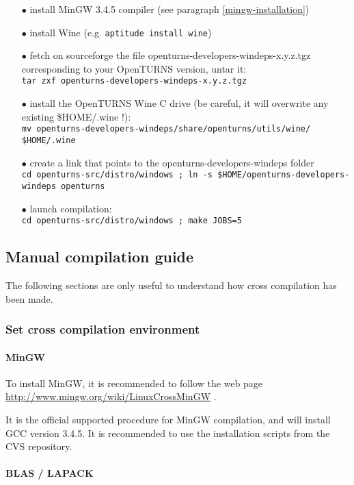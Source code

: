 \documentclass[11pt]{article}
\begin{document}
\begin{itemize}
\item[$\bullet$] install MinGW 3.4.5 compiler (see paragraph \ref{mingw-installation})
\item[$\bullet$] install Wine (e.g. \verb|aptitude install wine|)
\item[$\bullet$] fetch on sourceforge the file openturns-developers-windeps-x.y.z.tgz corresponding to your OpenTURNS version, untar it:\\
\verb|tar zxf openturns-developers-windeps-x.y.z.tgz|
\item[$\bullet$] install the OpenTURNS Wine C drive (be careful, it will overwrite any existing \$HOME/.wine !):  \\
\verb|mv openturns-developers-windeps/share/openturns/utils/wine/ $HOME/.wine|
\item[$\bullet$] create a link that points to the openturns-developers-windeps folder\\
\verb|cd openturns-src/distro/windows ; ln -s $HOME/openturns-developers-windeps openturns|
\item[$\bullet$] launch compilation: \\
\verb|cd openturns-src/distro/windows ; make JOBS=5|
\end{itemize}

\subsection{Manual compilation guide}

The following sections are only useful to understand how cross compilation has been made.

\subsubsection{Set cross compilation environment}

\paragraph{MinGW \label{mingw-installation}}
To install MinGW, it is recommended to follow the web page \url {http://www.mingw.org/wiki/LinuxCrossMinGW} .

It is the official supported procedure for MinGW compilation, and will install GCC version 3.4.5.
It is recommended to use the installation scripts from the CVS repository.

\paragraph{BLAS / LAPACK} 
\end{document}
